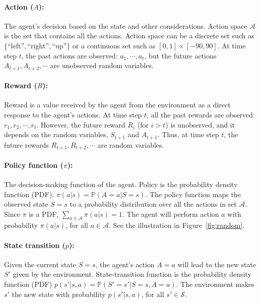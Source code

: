 \documentclass[11pt]{article}
\numberwithin{equation}{section}
\def\AM{{\mathcal A}}
\def\SM{{\mathcal S}}
\def\PB{{\mathbb P}}
\begin{document}
\paragraph{Action ($A$):}
The agent's decision based on the state and other considerations.
Action space $\AM$ is the set that contains all the actions.
Action space can be a discrete set such as $\{\textrm{``left''}, \textrm{``right''}, \textrm{``up''} \}$ or a continuous set such as $[0, 1] \times [-90, 90]$.
At time step $t$, the past actions are observed: $a_1, \cdots , a_t$, but the future actions $A_{t+1}, A_{t+2}, \cdots$ are unobserved random variables.


\paragraph{Reward ($R$):}
Reward is a value received by the agent from the environment as a direct response to the agent’s actions.
At time step $t$, all the past rewards are observed: $r_1, r_2, \cdots , r_t$.
However, the future reward $R_i$ (for $i > t$) is unobserved, and it depends on the random variables, $S_{t+1}$ and $A_{t+1}$.
Thus, at time step $t$, the future rewards $R_{t+1}, R_{t+2} , \cdots$ are random variables.




\paragraph{Policy function ($\pi $):}
The decision-making function of the agent. 
Policy is the probability density function (PDF): $\pi (a | s) = \PB ( A = a | S  = s )$.
The policy function maps the observed state $S=s$ to a probability distribution over all the actions in set $\AM$.
Since $\pi$ is a PDF, $\sum_{a \in \AM } \pi (a | s) = 1$.
The agent will perform action $a$ with probability $\pi (a | s)$, for all $a \in \AM$.
See the illustration in Figure~\ref{fig:random}.



\paragraph{State transition ($p $):}
Given the current state $S=s$, the agent's action $A=a$ will lead to the new state $S'$ given by the environment.
State-transition function is the probability density function (PDF) $p (s' | s, a) = \PB ( S'  = s' | S = s , A = a )$.
The environment makes $s'$ the new state with probability $p (s' | s, a)$, for all $s' \in \SM$.
\end{document}
